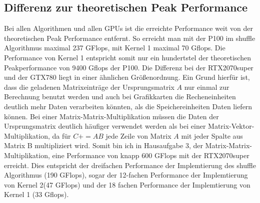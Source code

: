 \documentclass[10pt,a4paper]{article}
\begin{document}
	  \subsection{Differenz zur theoretischen Peak Performance}
	  Bei allen Algorithmen und allen GPUs ist die erreichte Performance weit von der theoretischen Peak Performance entfernt. So erreicht man mit der P100 im shuffle Algorithmus maximal 237 GFlops, mit Kernel 1 maximal 70 Gflops. Die Performance von Kernel 1 entspricht somit nur ein hundertstel der theoretischen Peakperformance von 9400 Gflops der P100. Die Differenz bei der RTX2070super und der GTX780 liegt in einer ähnlichen Größenordnung. Ein Grund hierfür ist, dass die geladenen Matrixeinträge der Ursprungsmatrix $A$ nur einmal zur Berechnung benutzt werden und auch bei Grafikkarten die Recheneinheiten deutlich mehr Daten verarbeiten könnten, als die Speichereinheiten Daten liefern können. Bei einer Matrix-Matrix-Multiplikation müssen die Daten der Ursprungsmatrix deutlich häufiger verwendet werden als bei einer Matrix-Vektor-Multiplikation, da für $C+=AB$ jede Zeile von Matrix $A$ mit jeder Spalte aus Matrix B multipliziert wird. Somit bin ich in Hausaufgabe 3, der Matrix-Matrix-Multiplikation, eine Performance von knapp 600 GFlops mit der RTX2070super erreicht. Dies entspricht der dreifachen Performance der Implemtierung des shuffle Algorithmus (190 GFlops), sogar der 12-fachen Performance der Implemtierung von Kernel 2(47 GFlops) und der 18 fachen Performance der Implemtierung von Kernel 1 (33 Gflops).
\end{document}
